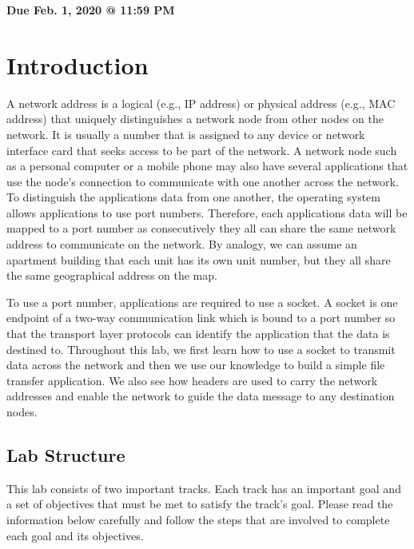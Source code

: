 \documentclass[11pt]{article}
\makeatletter
\def\datedue{Feb. 1, 2020 @ 11:59 PM}
\makeatother
\begin{document}
\maketitle \thispagestyle{fancy}

\hfill {\large \textbf{Due \datedue}}


\section{Introduction}
\label{sec:introduction}
A network address is a logical (e.g., IP address) or physical address (e.g., MAC address) that uniquely distinguishes a network node from other nodes on the network. It is usually a number that is assigned to any device or network interface card that seeks access to be part of the network. A network node such as a personal computer or a mobile phone may also have several applications that use the node's connection to communicate with one another across the network. To distinguish the applications data from one another, the operating system allows applications to use port numbers. Therefore, each applications data will be mapped to a port number as consecutively they all can share the same network address to communicate on the network. By analogy, we can assume an apartment building that each unit has its own unit number, but they all share the same geographical address on the map.

To use a port number, applications are required to use a socket. A socket is one endpoint of a two-way communication link which is bound to a port number so that the transport layer protocols can identify the application that the data is destined to. Throughout this lab, we first learn how to use a socket to transmit data across the network and then we use our knowledge to build a simple file transfer application. We also see how headers are used to carry the network addresses and enable the network to guide the data message to any destination nodes.

\subsection{Lab Structure}
\label{subsec:lab-structure}
This lab consists of two important tracks. Each track has an important goal and a set of objectives that must be met to satisfy the track's goal. Please read the information below carefully and follow the steps that are involved to complete each goal and its objectives.
\end{document}
